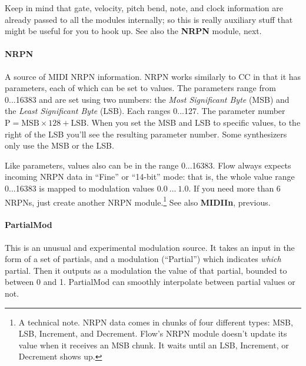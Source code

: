 \documentclass{article}
\newcommand\name{Flow}
\begin{document}
Keep in mind that gate, velocity, pitch bend, note, and clock information are already passed to all the modules internally; so this is really auxiliary stuff that might be useful for you to hook up.   See also the {\bf NRPN} module, next.

\paragraph{NRPN}  A source of MIDI NRPN information.  NRPN works similarly to CC in that it has parameters, each of which can be set to values.  The parameters range from 0...16383 and are set using two numbers: the {\it Most Significant Byte} (MSB) and the {\it Least Significant Byte} (LSB).  Each ranges 0...127.  The parameter number \(\text{P} = \text{MSB} \times 128 + \text{LSB}\).  When you set the MSB and LSB to specific values, to the right of the LSB you'll see the resulting parameter number.  Some synthesizers only use the MSB or the LSB.  

Like parameters, values also can be in the range 0...16383.  {\name} always expects incoming NRPN data in ``Fine'' or ``14-bit'' mode: that is, the whole value range 0...16383 is mapped to modulation values \(0.0\ ...\ 1.0\).  If you need more than 6 NRPNs, just create another NRPN module.\footnote{A technical note.  NRPN data comes in chunks of four different types: MSB, LSB, Increment, and Decrement.  Flow's NRPN module doesn't update its value when it receives an MSB chunk.  It waits until an LSB, Increment, or Decrement shows up.}  See also {\bf MIDIIn}, previous.

\paragraph{PartialMod}  This is an unusual and experimental modulation source.  It takes an input in the form of a set of partials, and a modulation (``Partial'') which indicates {\it which} partial.  Then it outputs as a modulation the value of that partial, bounded to between 0 and 1.  PartialMod can smoothly interpolate between partial values or not.

\end{document}
